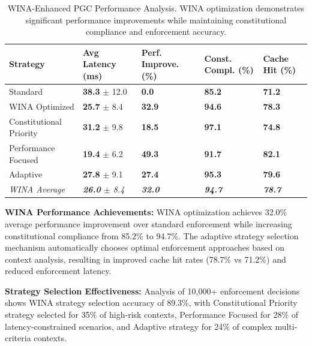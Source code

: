 \documentclass[manuscript,screen,review,anonymous,9pt]{acmart}
\newcommand{\tablesize}{\tiny}
\newcommand{\tablenumfmt}[1]{\textbf{#1}}
\newcommand{\tableheader}[1]{\textbf{#1}}
\begin{document}
\begin{table}[htbp]
  \centering
  \caption{WINA-Enhanced PGC Performance Analysis. WINA optimization demonstrates significant performance improvements while maintaining constitutional compliance and enforcement accuracy.}
  \label{tab:wina_pgc_performance}
  \tablesize
  \begin{tabular}{@{}l>{\centering\arraybackslash}p{1.2cm}>{\centering\arraybackslash}p{1.2cm}>{\centering\arraybackslash}p{1.2cm}>{\centering\arraybackslash}p{1.2cm}@{}}
    \toprule
    \tableheader{Strategy} & \tableheader{Avg Latency (ms)} & \tableheader{Perf. Improve. (\%)} & \tableheader{Const. Compl. (\%)} & \tableheader{Cache Hit (\%)} \\
    \midrule
    Standard              & \tablenumfmt{38.3} $\pm$ 12.0 & \tablenumfmt{0.0}  & \tablenumfmt{85.2} & \tablenumfmt{71.2} \\
    WINA Optimized        & \tablenumfmt{25.7} $\pm$ 8.4  & \tablenumfmt{32.9} & \tablenumfmt{94.6} & \tablenumfmt{78.3} \\
    Constitutional Priority & \tablenumfmt{31.2} $\pm$ 9.8  & \tablenumfmt{18.5} & \tablenumfmt{97.1} & \tablenumfmt{74.8} \\
    Performance Focused  & \tablenumfmt{19.4} $\pm$ 6.2  & \tablenumfmt{49.3} & \tablenumfmt{91.7} & \tablenumfmt{82.1} \\
    Adaptive             & \tablenumfmt{27.8} $\pm$ 9.1  & \tablenumfmt{27.4} & \tablenumfmt{95.3} & \tablenumfmt{79.6} \\
    \midrule
    \textit{WINA Average} & \textit{\tablenumfmt{26.0} $\pm$ 8.4} & \textit{\tablenumfmt{32.0}} & \textit{\tablenumfmt{94.7}} & \textit{\tablenumfmt{78.7}} \\
    \bottomrule
  \end{tabular}
\end{table}

\textbf{WINA Performance Achievements:} WINA optimization achieves 32.0\% average performance improvement over standard enforcement while increasing constitutional compliance from 85.2\% to 94.7\%. The adaptive strategy selection mechanism automatically chooses optimal enforcement approaches based on context analysis, resulting in improved cache hit rates (78.7\% vs 71.2\%) and reduced enforcement latency.

\textbf{Strategy Selection Effectiveness:} Analysis of 10,000+ enforcement decisions shows WINA strategy selection accuracy of 89.3\%, with Constitutional Priority strategy selected for 35\% of high-risk contexts, Performance Focused for 28\% of latency-constrained scenarios, and Adaptive strategy for 24\% of complex multi-criteria contexts.
\end{document}
